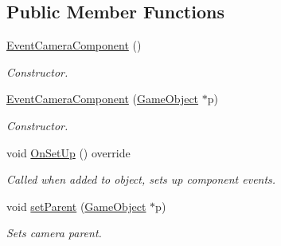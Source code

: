 \subsection*{Public Member Functions}
\begin{DoxyCompactItemize}
\item 
\mbox{\label{class_event_camera_component_abc07b7411c3fc4976b9b1c2d986cfbfc}} 
\mbox{\hyperlink{class_event_camera_component_abc07b7411c3fc4976b9b1c2d986cfbfc}{Event\+Camera\+Component}} ()
\begin{DoxyCompactList}\small\item\em Constructor. \end{DoxyCompactList}\item 
\mbox{\label{class_event_camera_component_ac4fb242d4e7c859481e520bd990e7f3d}} 
\mbox{\hyperlink{class_event_camera_component_ac4fb242d4e7c859481e520bd990e7f3d}{Event\+Camera\+Component}} (\mbox{\hyperlink{class_game_object}{Game\+Object}} $\ast$p)
\begin{DoxyCompactList}\small\item\em Constructor. \end{DoxyCompactList}\item 
\mbox{\label{class_event_camera_component_a603f483159f572389fd4f507e8cde88c}} 
void \mbox{\hyperlink{class_event_camera_component_a603f483159f572389fd4f507e8cde88c}{On\+Set\+Up}} () override
\begin{DoxyCompactList}\small\item\em Called when added to object, sets up component events. \end{DoxyCompactList}\item 
\mbox{\label{class_event_camera_component_af7f1cde6285041f3d33707c52c52261e}} 
void \mbox{\hyperlink{class_event_camera_component_af7f1cde6285041f3d33707c52c52261e}{set\+Parent}} (\mbox{\hyperlink{class_game_object}{Game\+Object}} $\ast$p)
\begin{DoxyCompactList}\small\item\em Sets camera parent. \end{DoxyCompactList}\item 
\mbox{\label{class_event_camera_component_a6a2c0f4293f3f7d35296c9e00709ad40}} 

\end{DoxyCompactItemize}
